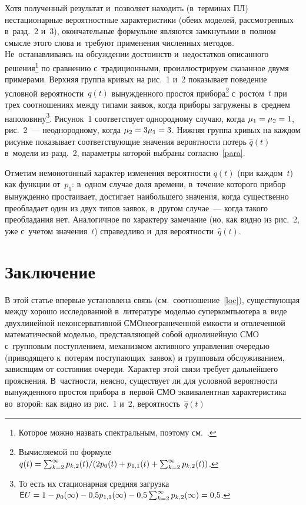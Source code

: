 \begin{multicols}{2}
Хотя полученный результат и~позволяет находить (в~терминах ПЛ)
нестационарные вероятностные характеристики (обеих моделей, рас\-смот\-рен\-ных в~разд.~2 и~3),
окончательные формулы\linebreak не являются замкнутыми в~полном смысле этого слова
и~требуют применения численных методов.
Не~останавливаясь на обсуждении достоинств и~недостатков описанного
решения\footnote{Которое можно назвать спектральным, поэтому см.~\cite[Ch.~13]{161}.}
по \mbox{сравнению} с~традиционными, проиллюстрируем сказанное двумя примерами.
Верхняя группа кривых на рис.~1 и~2 показывает поведение
условной вероятности~${q}(t)$ вынужденного простоя прибора\footnote{Вычисляемой по формуле
${q}(t)={\sum\nolimits_{k=2}^\infty {p}_{k,2}(t)/(2p_0(t)\hm+{p}_{1,1}(t)\hm+\sum\nolimits_{k=2}^\infty 
{p}_{k,2}(t))}$.}
с~ростом~$t$ при трех соотношениях между типами
заявок, когда приборы загружены в~среднем наполовину\footnote{То есть их стационарная средняя загрузка 
$\mathsf{E}U\hm=1\hm-p_0(\infty)\hm-0{,}5 {p}_{1,1}(\infty)\hm-0{,}5\sum\nolimits _{k=2}^\infty 
{p}_{k,2}(\infty)\hm=0{,}5$.}.
Рисунок~1 соответствует однородному случаю, когда ${\mu_1\hm=\mu_2\hm=1}$,
рис.~2~--- неоднородному, когда ${\mu_2\hm=3 \mu_1\hm=3}$.
Нижняя группа кривых на каждом рисунке показывает
соответствующие значения вероятности потерь ${{\hat {q}}(t)}$
в~модели из разд.~2, па\-ра\-мет\-ры которой выбраны согласно~\eqref{para}.



Отметим немонотонный характер изменения вероятности ${q}(t)$ (при 
каждом~$t$) как функции от~$p_1$:
в~одном случае доля времени, в~течение которого прибор вынужденно простаивает,
достигает наибольшего значения, когда существенно преобладает один из
двух типов заявок, в~другом случае~--- когда такого преобладания нет.
Аналогичное по характеру замечание (но, как видно из рис.~2, уже
с~учетом значения~$t$) справедливо
и~для ве\-ро\-ят\-ности~${\hat {q}}(t)$.

\vspace*{-6pt}

\section{Заключение}

В этой статье впервые установлена связь (см.\ соотношение~\eqref{loc}),
существующая между хорошо исследованной в~литературе моделью суперкомпьютера
в~виде двухлинейной неконсервативной СМО\linebreak неограниченной ем\-кости
и отвлеченной математической моделью, представляющей собой
однолинейную СМО с~групповым поступлением, механизмом
активного управ\-ле\-ния очередью (\mbox{приводящего} к~потерям поступающих~заявок)
и групповым обслуживанием, зависящим от со\-сто\-яния очереди.
Характер этой связи требует дальнейшего прояснения.
В~част\-ности, неясно, существует ли для условной
ве\-ро\-ят\-ности вынужденного простоя прибора в~первой СМО
эквивалентная характеристика
во~второй:
как видно из рис.~1 и~2, вероятность~${{\hat {q}}(t)}$\linebreak\vspace*{-12pt}


\end{multicols}
